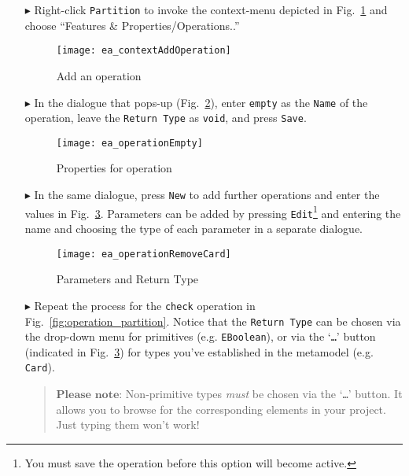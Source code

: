 \begin{enumerate}
\item[$\blacktriangleright$] Right-click \texttt{Partition} to invoke the context-menu depicted in Fig.~\ref{fig:add_operation} and choose ``Features \&
Properties/Operations..''

\begin{figure}[htbp]
	\centering
  \texttt{[image: ea\_contextAddOperation]}
	\caption{Add an operation}
	\label{fig:add_operation}
\end{figure}
\FloatBarrier

\item[$\blacktriangleright$] In the dialogue that pops-up (Fig.~\ref{fig:operation_properties}), enter \texttt{empty} as the \texttt{Name} of the operation,
leave the \texttt{Return Type} as \texttt{void}, and press \texttt{Save}.

\begin{figure}[htbp]
	\centering
  	\texttt{[image: ea\_operationEmpty]}
	\caption{Properties for operation}
	\label{fig:operation_properties}
\end{figure}
\FloatBarrier

\item[$\blacktriangleright$] In the same dialogue, press \texttt{New} to add further operations and enter the values in Fig.~\ref{fig:operation_parameters}. 
Parameters can be added by pressing \texttt{Edit}\footnote{You must save the operation before this option will become active.} and entering the name and
choosing the type of each parameter in a separate dialogue.

\begin{figure}[htbp]
	\centering
  \texttt{[image: ea\_operationRemoveCard]}
	\caption{Parameters and Return Type}
	\label{fig:operation_parameters}
\end{figure}
\FloatBarrier

\vfill
\pagebreak

\item[$\blacktriangleright$] Repeat the process for the \texttt{check} operation in Fig.~\ref{fig:operation_partition}.
Notice that the \texttt{Return Type} can be chosen via the drop-down menu for primitives (e.g. \texttt{EBoolean}), or via the `\texttt{\ldots}' button
(indicated in Fig.~\ref{fig:operation_parameters}) for types you've established in the metamodel (e.g. \texttt{Card}).

\vspace{-.5cm}
\begin{quote}
$\textbf{Please note:}$ Non-primitive types \emph{must} be chosen via the `\texttt{\ldots}' button. It allows you to browse for the corresponding elements in
your project. Just typing them won't work!
\end{quote}



\end{enumerate}
